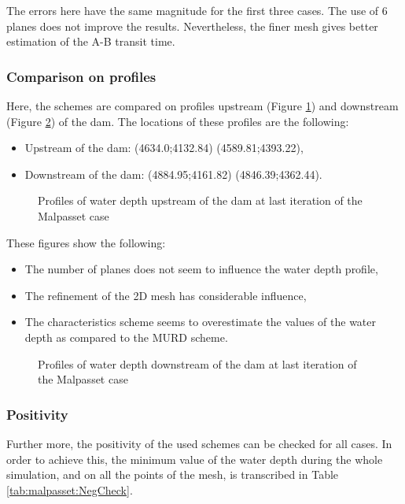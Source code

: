 The errors here have the same magnitude for the first three cases. The use of 6 planes does not improve the results. Nevertheless, the finer mesh gives better estimation of the A-B transit time.


\subsubsection*{Comparison on profiles}
Here, the schemes are compared on profiles upstream (Figure \ref{fig:malpasset:upstreamProfile}) and downstream (Figure \ref{fig:malpasset:downstreamProfile}) of the dam. The locations of these profiles are the following:
\begin{itemize}
\itemsep0em
\item Upstream of the dam: (4634.0;4132.84) (4589.81;4393.22),
\item Downstream of the dam: (4884.95;4161.82) (4846.39;4362.44).
\end{itemize}

\begin{figure}[H]
  \centering
  \caption{Profiles of water depth upstream of the dam at last iteration of the Malpasset case}\label{fig:malpasset:upstreamProfile}
\end{figure}
These figures show the following:
\begin{itemize}
\itemsep0em
\item The number of planes does not seem to influence the water depth profile,
\item The refinement of the 2D mesh has considerable influence,
\item The characteristics scheme seems to overestimate the values of the water depth as compared to the MURD scheme.
\end{itemize}
\begin{figure}[H]
  \centering
  \caption{Profiles of water depth downstream of the dam at last iteration of the Malpasset case}\label{fig:malpasset:downstreamProfile}
\end{figure}

\subsubsection*{Positivity}
Further more, the positivity of the used schemes can be checked for all cases. In order to achieve this, the minimum value of the water depth during the whole simulation, and on all the points of the mesh, is transcribed in Table \ref{tab:malpasset:NegCheck}.

